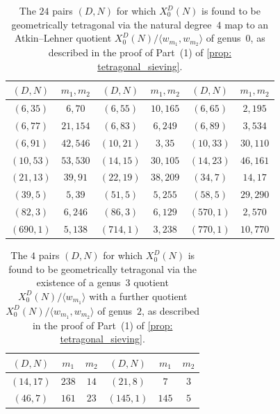 \documentclass[11pt,reqno]{amsart}
\theoremstyle{definition}
\begin{document}
{
\begin{longtable}{|c|c||c|c||c|c|}
\caption{The $24$ pairs $(D,N)$ for which $X_0^D(N)$ is found to be geometrically tetragonal via the natural degree~$4$ map to an Atkin--Lehner quotient $X_0^D(N)/\langle w_{m_1}, w_{m_2} \rangle$ of genus~$0$, as described in the proof of Part~(1) of \cref{prop: tetragonal_sieving}.}\label{table: tetragonal_AL4} \\ \hline 
$(D,N)$ & $m_1, m_2$ & $(D,N)$ & $m_1, m_2$ & $(D,N)$ & $m_1, m_2$ \\ \hline \hline
$ (
6 , 35 )$ & $
6 , 70 $
 & 
$ (
6 , 55 )$ & $
10 , 165 $
 & 
$ (
6 , 65 )$ & $
2 , 195 $
\\ \hline
$ (
6 , 77 )$ & $
21 , 154 $
 & 
$ (
6 , 83 )$ & $
6 , 249 $
 & 
$ (
6 , 89 )$ & $
3 , 534 $
\\ \hline
$ (
6 , 91 )$ & $
42 , 546 $
 & 
$ (
10 , 21 )$ & $
3 , 35 $
 & 
$ (
10 , 33 )$ & $
30 , 110 $
\\ \hline
$ (
10 , 53 )$ & $
53 , 530 $
 & 
$ (
14 , 15 )$ & $
30 , 105 $
 & 
$ (
14 , 23 )$ & $
46 , 161 $
\\ \hline
$ (
21 , 13 )$ & $
39 , 91 $
 & 
$ (
22 , 19 )$ & $
38 , 209 $
 & 
$ (
34 , 7 )$ & $
14 , 17 $
\\ \hline
$ (
39 , 5 )$ & $
5 , 39 $
 & 
$ (
51 , 5 )$ & $
5 , 255 $
 & 
$ (
58 , 5 )$ & $
29 , 290 $
\\ \hline
$ (
82 , 3 )$ & $
6 , 246 $
 & 
$ (
86 , 3 )$ & $
6 , 129 $
 & 
$ (
570 , 1 )$ & $
2 , 570 $
\\ \hline
$ (
690 , 1 )$ & $
5 , 138 $
 & 
$ (
714 , 1 )$ & $
3 , 238 $
 & 
$ (
770 , 1 )$ & $
10 , 770 $
\\ \hline

\end{longtable}


\begin{longtable}{|c|c|c| |c|c|c|}
\caption{The $4$ pairs $(D,N)$ for which $X_0^D(N)$ is found to be geometrically tetragonal via the existence of a genus~$3$ quotient $X_0^D(N)/\langle w_{m_1} \rangle$ with a further quotient $X_0^D(N)/\langle w_{m_1}, w_{m_2} \rangle$ of genus~$2$, as described in the proof of Part~(1) of \cref{prop: tetragonal_sieving}.}\label{table: geom_tetragonal_by_Polizzi} \\ \hline 
$(D,N)$ & $m_1$ & $m_2$ & $(D,N)$ & $m_1$ & $m_2$  \\ \hline \hline
$(14,17)$ & $238$ & $14$ &
$(21,8)$ & $7$ & $3$ \\ \hline
$(46,7)$ & $161$ & $23$ &
$(145,1)$ & $145$ & $5$ \\ \hline 
\end{longtable}
}
\end{document}
